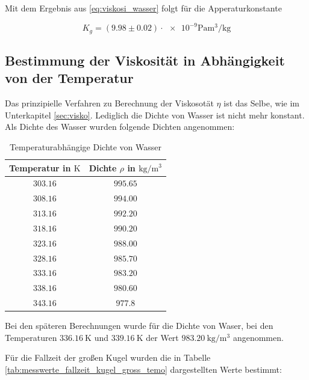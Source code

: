 Mit dem Ergebnis aus \eqref{eq:viskosi_wasser} folgt für die 
Apperaturkonstante

\begin{equation}
\label{eq:app_konst_gross}
K_{g}=\left(\num{9.98}\pm\num{0.02}\right)\cdot{\num{e-9}} \si{\pascal\cubic\meter\per\kilogram}
\end{equation}

\subsection{Bestimmung der Viskosität in Abhängigkeit von der Temperatur}

Das prinzipielle Verfahren zu Berechnung der Viskosotät $\eta$ ist
das Selbe, wie im Unterkapitel \ref{sec:visko}.
Lediglich die Dichte von Wasser ist nicht mehr konstant.
Als Dichte des Wasser wurden folgende Dichten angenommen:  %

\begin{table}
\centering
\begin{tabular} {cc}
  \toprule
  Temperatur in $\si{\kelvin}$ & Dichte $\rho$ in $\si{\kilogram\per\cubic\meter}$ \\
  \midrule
  $\num{303.16}$ &$\num{995.65}$ \\
  $\num{308.16}$ &$\num{994.00}$\\
  $\num{313.16}$ &$\num{992.20}$\\
  $\num{318.16}$ &$\num{990.20}$\\
  $\num{323.16}$ &$\num{988.00}$\\
  $\num{328.16}$ &$\num{985.70}$\\
  $\num{333.16}$ &$\num{983.20}$\\
  $\num{338.16}$ &$\num{980.60}$\\
  $\num{343.16}$ &$\num{977.8}$\\
\bottomrule
\end{tabular}
\caption{Temperaturabhängige Dichte von Wasser}
\label{tab:dichtewasser}
\end{table}

Bei den späteren Berechnungen wurde für die Dichte von Waser, bei den Temperaturen $\SI{336.16}{\kelvin}$ und $\SI{339.16}{\kelvin}$ 
der Wert $\SI{983.20}{\kilogram\per\cubic\meter}$ angenommen.

Für die Fallzeit der großen Kugel wurden die in Tabelle \ref{tab:messwerte_fallzeit_kugel_gross_temo}
dargestellten Werte bestimmt:

